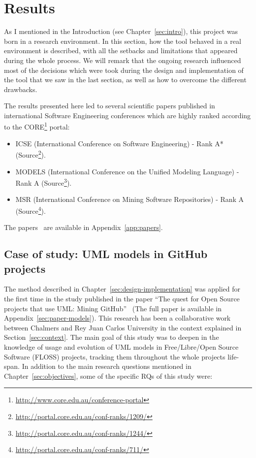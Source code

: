 \documentclass[a4paper, 12pt]{book}
\begin{document}
\chapter{Results}
\label{sec:results}

As I mentioned in the Introduction (see Chapter~\ref{sec:intro}), this project was born in a research environment.
In this section, how the tool behaved in a real environment is described, with all the setbacks
and limitations that appeared during the whole process. We will remark that the ongoing research
influenced most of the decisions which were took during the design and implementation
of the tool that we saw in the last section, as well as how to overcome the different drawbacks.

The results presented here led to several scientific papers published in international Software Engineering
conferences which are highly ranked according to the CORE\footnote{\url{http://www.core.edu.au/conference-portal}} portal:
\begin{itemize}
    \item ICSE (International Conference on Software Engineering) - Rank A* (Source\footnote{\url{http://portal.core.edu.au/conf-ranks/1209/}}).
    \item MODELS (International Conference on the Unified Modeling Language) - Rank A (Source\footnote{\url{http://portal.core.edu.au/conf-ranks/1244/}}).
    \item MSR (International Conference on Mining Software Repositories) - Rank A (Source\footnote{\url{http://portal.core.edu.au/conf-ranks/711/}}).
\end{itemize}

The papers~\cite{hebig2016quest,ho2017practices,robles2017extensive} are available in Appendix~\ref{app:papers}.


\section{Case of study: UML models in GitHub projects}
\label{sec:case-study-uml}

The method described in Chapter~\ref{sec:design-implementation} was applied for the first time in the study
published in the paper ``The quest for Open Source projects that use UML: Mining GitHub''~\cite{hebig2016quest}
(The full paper is available in Appendix~\ref{sec:paper-models}).
This research has been a collaborative work between Chalmers and Rey Juan Carlos University in the context
explained in Section~\ref{sec:context}.
The main goal of this study was to deepen in the knowledge of usage and evolution of UML models in
Free/Libre/Open Source Software (FLOSS) projects, tracking them throughout the whole projects life-span.
In addition to the main research questions mentioned in Chapter~\ref{sec:objectives}, some of the specific RQs
of this study were:
\end{document}
